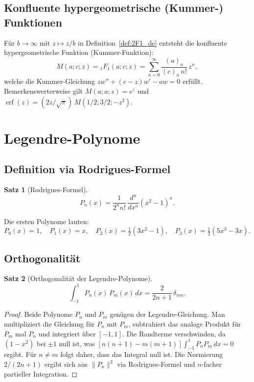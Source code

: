 \documentclass[12pt,a4paper]{amsart}
\newtheorem{theorem}{Satz}[section]
\theoremstyle{definition}
\begin{document}
\subsection{Konfluente hypergeometrische (Kummer-) Funktionen}

Für \(b \to \infty\) mit \(z \mapsto z/b\) in Definition~\ref{def:2F1_de} entsteht die
konfluente hypergeometrische Funktion (Kummer-Funktion):
\[
  M(a;c;z) = {}_1F_1(a;c;z)
  = \sum_{n=0}^\infty \frac{(a)_n}{(c)_n\,n!}\,z^n,
\]
welche die Kummer-Gleichung \(z w'' + (c-z)w' - aw = 0\) erfüllt.
Bemerkenswerterweise gilt \(M(a;a;z) = e^z\) und
\(\operatorname{erf}(z) = (2z/\sqrt{\pi})\,M(1/2;3/2;-z^2)\).

\section{Legendre-Polynome}
\label{sec:legendre}

\subsection{Definition via Rodrigues-Formel}

\begin{theorem}[Rodrigues-Formel]\label{thm:rodrigues_de}
\[
  P_n(x) = \frac{1}{2^n n!}\,\frac{d^n}{dx^n}(x^2-1)^n.
\]
\end{theorem}

Die ersten Polynome lauten:
\[
  P_0(x)=1,\quad P_1(x)=x,\quad P_2(x)=\tfrac{1}{2}(3x^2-1),\quad
  P_3(x)=\tfrac{1}{2}(5x^3-3x).
\]

\subsection{Orthogonalität}

\begin{theorem}[Orthogonalität der Legendre-Polynome]\label{thm:legendre_ortho_de}
\[
  \int_{-1}^1 P_n(x)\,P_m(x)\,dx = \frac{2}{2n+1}\,\delta_{nm}.
\]
\end{theorem}

\begin{proof}
Beide Polynome \(P_n\) und \(P_m\) genügen der Legendre-Gleichung.
Man multipliziert die Gleichung für \(P_n\) mit \(P_m\), subtrahiert das analoge
Produkt für \(P_m\) mal \(P_n\) und integriert über \([-1,1]\).
Die Randterme verschwinden, da \((1-x^2)\) bei \(\pm 1\) null ist, was
\([n(n+1)-m(m+1)]\int_{-1}^1 P_n P_m\,dx = 0\) ergibt.
Für \(n \neq m\) folgt daher, dass das Integral null ist.
Die Normierung \(2/(2n+1)\) ergibt sich aus \(\|P_n\|^2\) via Rodrigues-Formel
und \(n\)-facher partieller Integration.
\end{proof}
\end{document}
